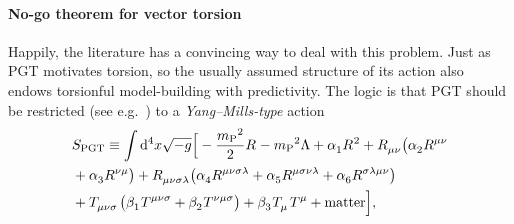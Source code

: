 \documentclass[aps,prd,reprint,preprintnumbers,showpacs,floatfix,nofootinbib,superscript address]{revtex4-2}
\begin{document}
\paragraph*{No-go theorem for vector torsion} Happily, the literature has a convincing way to deal with this problem. Just as PGT motivates torsion, so the usually assumed structure of its action also endows torsionful model-building with predictivity. The logic is that PGT should be restricted (see e.g.~\cite{Hayashi:1967se,Hayashi:1980qp,Yo:1999ex,Yo:2001sy,Puetzfeld:2004yg}) to a \emph{Yang--Mills-type} action
\begin{align}\label{PGTAction}
	&S_{\text{PGT}}\equiv\int\mathrm{d}^4x\sqrt{-g}\Big[
	-\frac{\MPl^2}{2}\MAGF{}
	-\MPl{}^2\Lambda
	+\Alp{1}\MAGF{}^2
	+\MAGF{_{\mu\nu}}\big(
	\Alp{2}\MAGF{^{\mu\nu}}
	\nonumber\\ &
	+\Alp{3}\MAGF{^{\nu\mu}}\big)
	+\MAGF{_{\mu\nu\sigma\lambda}}\big(
	\Alp{4}\MAGF{^{\mu\nu\sigma\lambda}}
	+\Alp{5}\MAGF{^{\mu\sigma\nu\lambda}}
	+\Alp{6}\MAGF{^{\sigma\lambda\mu\nu}}\big)
	\nonumber\\ &
	+\MAGT{_{\mu\nu\sigma}}\big(\Bet{1}\MAGT{^{\mu\nu\sigma}}
	+\Bet{2}\MAGT{^{\nu\mu\sigma}}\big)
	+\Bet{3}\MAGT{_{\mu}}\MAGT{^{\mu}}
	+\text{matter}
	\Big],
\end{align}
\end{document}
